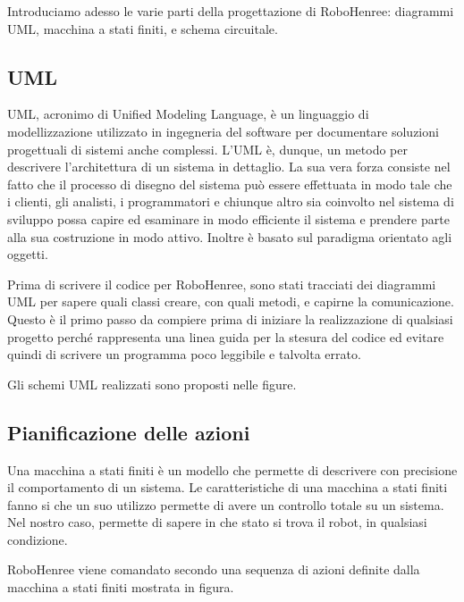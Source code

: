 \documentclass[a4paper,12pt,italian]{article}
\begin{document}
Introduciamo adesso le varie parti della progettazione di RoboHenree: diagrammi UML, macchina a stati finiti, e schema circuitale.

\subsection{UML}
UML, acronimo di Unified Modeling Language, è un linguaggio di modellizzazione utilizzato in ingegneria del software per documentare soluzioni progettuali di sistemi anche complessi. L’UML è, dunque, un metodo per descrivere l’architettura di un sistema in dettaglio. La sua vera forza consiste nel fatto che il processo di disegno del sistema può essere effettuata in modo tale che i clienti, gli analisti, i programmatori e chiunque altro sia coinvolto nel sistema di sviluppo possa capire ed esaminare in modo efficiente il sistema e prendere parte alla sua costruzione in modo attivo. Inoltre è basato sul paradigma orientato agli oggetti. 

Prima di scrivere il codice per RoboHenree, sono stati tracciati dei diagrammi UML per sapere quali classi creare, con quali metodi, e capirne la comunicazione. Questo è il primo passo da compiere prima di iniziare la realizzazione di qualsiasi progetto perché rappresenta una linea guida per la stesura del codice ed evitare quindi di scrivere un programma poco leggibile e talvolta errato. 

Gli schemi UML realizzati sono proposti nelle figure.


\subsection{Pianificazione delle azioni}
\label{Sec: FSM}

Una macchina a stati finiti è un modello che permette di descrivere con precisione il comportamento di un sistema. Le caratteristiche di una macchina a stati finiti fanno si che un suo utilizzo permette di avere un controllo totale su un sistema. Nel nostro caso, permette di sapere in che stato si trova il robot, in qualsiasi condizione.

RoboHenree viene comandato secondo una sequenza di azioni definite dalla macchina a stati finiti mostrata in figura.
\end{document}

